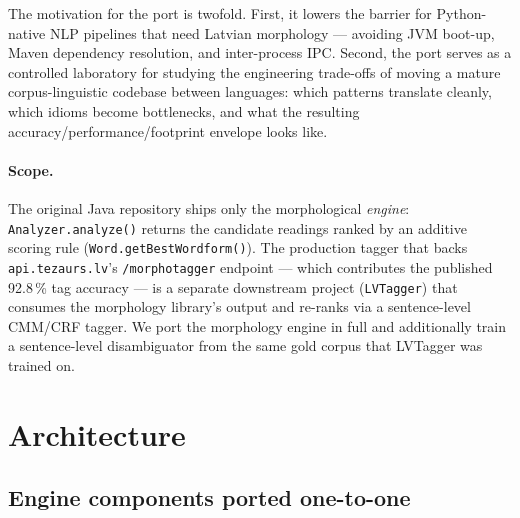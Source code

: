 \documentclass[11pt,a4paper]{article}
\begin{document}
The motivation for the port is twofold. First, it lowers the barrier for
Python-native NLP pipelines that need Latvian morphology --- avoiding JVM
boot-up, Maven dependency resolution, and inter-process IPC. Second, the port
serves as a controlled laboratory for studying the engineering trade-offs of
moving a mature corpus-linguistic codebase between languages: which patterns
translate cleanly, which idioms become bottlenecks, and what the resulting
accuracy/performance/footprint envelope looks like.

\paragraph{Scope.} The original Java repository ships only the morphological
\emph{engine}: \texttt{Analyzer.analyze()} returns the candidate readings
ranked by an additive scoring rule (\texttt{Word.getBestWordform()}). The
production tagger that backs \texttt{api.tezaurs.lv}'s
\texttt{/morphotagger} endpoint --- which contributes the published 92.8\,\%
tag accuracy --- is a separate downstream project (\texttt{LVTagger}) that
consumes the morphology library's output and re-ranks via a
sentence-level CMM/CRF tagger. We port the morphology engine in full and
additionally train a sentence-level disambiguator from the same gold corpus
that LVTagger was trained on.

\section{Architecture}

\subsection{Engine components ported one-to-one}
\end{document}
